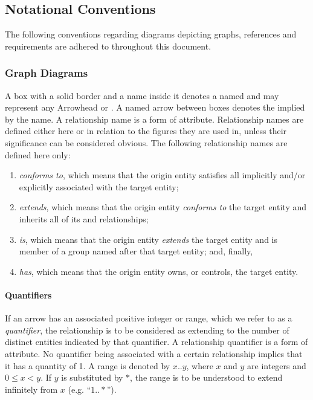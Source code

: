 \newpage

\subsection{Notational Conventions}
\label{sec:introduction:conventions}

The following conventions regarding diagrams depicting graphs, references and requirements are adhered to throughout this document.

\subsubsection{Graph Diagrams}
\label{sec:introduction:conventions:graphs}

A box with a solid border and a name inside it denotes a named  and may represent any Arrowhead  or .
A named arrow between boxes denotes the  implied by the name.
A relationship name is a form of attribute.
Relationship names are defined either here or in relation to the figures they are used in, unless their significance can be considered obvious.
The following relationship names are defined here only:

\begin{enumerate}
\item \textit{conforms to}, which means that the origin entity satisfies all  implicitly and/or explicitly associated with the target entity;
\item \textit{extends}, which means that the origin entity \textit{conforms to} the target entity and inherits all of its  and relationships;
\item \textit{is}, which means that the origin entity \textit{extends} the target entity and is member of a group named after that target entity; and, finally,
\item \textit{has}, which means that the origin entity owns, or controls, the target entity.
\end{enumerate}

\paragraph{Quantifiers}
If an arrow has an associated positive integer or range, which we refer to as a \textit{quantifier}, the relationship is to be considered as extending to the number of distinct entities indicated by that quantifier.
A relationship quantifier is a form of attribute.
No quantifier being associated with a certain relationship implies that it has a quantity of 1.
A range is denoted by $x..y$, where $x$ and $y$ are integers and $0 \leq x < y$.
If $y$ is substituted by $*$, the range is to be understood to extend infinitely from $x$ (e.g. ``$1..*$'').

